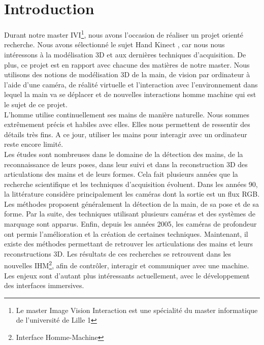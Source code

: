 \chapter*{Introduction}

Durant notre master IVI\footnote{Le master Image Vision Interaction est 
une spécialité du master informatique de l'université de Lille 1}, 
nous avons l'occasion de réaliser un projet orienté recherche. Nous avons 
sélectionné le sujet \og Hand Kinect \fg, car nous nous intéressons à la 
modélisation 3D et aux dernières techniques d'acquisition.
De plus, ce projet est en rapport avec chacune des matières de
notre master. Nous utilisons des notions de modélisation 3D de la main, de vision par ordinateur à l'aide d'une caméra, de réalité virtuelle et l'interaction avec l'environnement dans lequel la main va se déplacer et de nouvelles interactions
homme machine qui est le sujet de ce projet.\\

L'homme utilise continuellement ses mains de manière naturelle. Nous 
sommes extrêmement précis et habiles avec elles. Elles nous permettent 
de ressentir des détails très fins. A ce jour, 
utiliser les mains pour interagir avec un ordinateur reste encore limité.\\

Les études sont nombreuses dans le domaine de la détection des mains, 
de la reconnaissance de leurs poses, dans leur suivi et dans la reconstruction 
3D des articulations des mains et de leurs formes. Cela fait plusieurs 
années que la recherche scientifique et les techniques d'acquisition 
évoluent. Dans les années 90, la littérature considère principalement les 
caméras dont la sortie est un flux RGB. Les méthodes proposent généralement la 
détection de la main, de sa pose et de sa forme. Par la suite, des techniques 
utilisant plusieurs caméras et des systèmes de marquage sont apparus. 
Enfin, depuis les années 2005, les caméras de profondeur ont permis 
l'amélioration et la création de certaines techniques. Maintenant, il 
existe des méthodes permettant de retrouver les articulations des mains 
et leurs reconstructions 3D. Les résultats de ces recherches se 
retrouvent dans les nouvelles IHM\footnote{Interface Homme-Machine}, 
afin de contrôler, interagir et communiquer avec une machine. Les enjeux 
sont d'autant plus intéressants actuellement, avec le développement des 
interfaces immersives.\\

